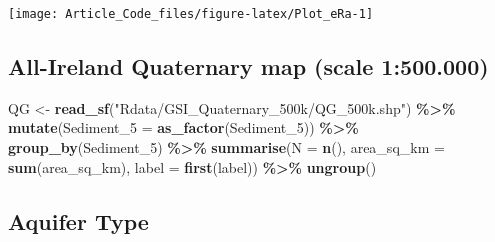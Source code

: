 \documentclass[
  12pt,
]{article}
\newenvironment{Shaded}{\begin{snugshade}}{\end{snugshade}}
\newcommand{\DataTypeTok}[1]{\textcolor[rgb]{0.13,0.29,0.53}{#1}}
\newcommand{\DecValTok}[1]{\textcolor[rgb]{0.00,0.00,0.81}{#1}}
\newcommand{\KeywordTok}[1]{\textcolor[rgb]{0.13,0.29,0.53}{\textbf{#1}}}
\newcommand{\NormalTok}[1]{#1}
\newcommand{\OperatorTok}[1]{\textcolor[rgb]{0.81,0.36,0.00}{\textbf{#1}}}
\newcommand{\StringTok}[1]{\textcolor[rgb]{0.31,0.60,0.02}{#1}}
\begin{document}
\begin{center}\texttt{[image: Article\_Code\_files/figure-latex/Plot\_eRa-1]} \end{center}

\hypertarget{all-ireland-quaternary-map-scale-1500.000}{%
\subsection{All-Ireland Quaternary map (scale
1:500.000)}\label{all-ireland-quaternary-map-scale-1500.000}}

\begin{Shaded}
\begin{Highlighting}[]
\NormalTok{  QG \textless{}{-}}\StringTok{ }\KeywordTok{read\_sf}\NormalTok{(}\StringTok{"Rdata/GSI\_Quaternary\_500k/QG\_500k.shp"}\NormalTok{) }\OperatorTok{\%\textgreater{}\%}\StringTok{ }
\StringTok{    }\KeywordTok{mutate}\NormalTok{(}\DataTypeTok{Sediment\_5 =} \KeywordTok{as\_factor}\NormalTok{(Sediment\_}\DecValTok{5}\NormalTok{)) }\OperatorTok{\%\textgreater{}\%}
\StringTok{    }\KeywordTok{group\_by}\NormalTok{(Sediment\_}\DecValTok{5}\NormalTok{) }\OperatorTok{\%\textgreater{}\%}
\StringTok{    }\KeywordTok{summarise}\NormalTok{(}\DataTypeTok{N =} \KeywordTok{n}\NormalTok{(),}
              \DataTypeTok{area\_sq\_km =} \KeywordTok{sum}\NormalTok{(area\_sq\_km),}
              \DataTypeTok{label =} \KeywordTok{first}\NormalTok{(label)) }\OperatorTok{\%\textgreater{}\%}
\StringTok{    }\KeywordTok{ungroup}\NormalTok{()}
\end{Highlighting}
\end{Shaded}

\hypertarget{aquifer-type}{%
\subsection{Aquifer Type}\label{aquifer-type}}
\end{document}
